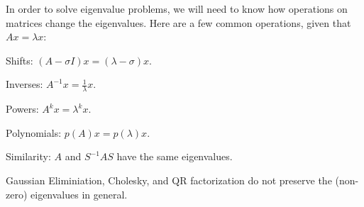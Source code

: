 In order to solve eigenvalue problems, we will need to know how operations on
matrices change the eigenvalues. Here are a few common operations, given that
$Ax=\lambda x$:
\begin{enumerati}
  \item Shifts: $(A-\sigma I)x=(\lambda-\sigma)x$.
  \item Inverses: $A^{-1}x=\frac1\lambda x$.
  \item Powers: $A^kx=\lambda^kx$.
  \item Polynomials: $p(A)x=p(\lambda)x$.
  \item Similarity: $A$ and $S^{-1}AS$ have the same eigenvalues.
  \item Gaussian Eliminiation, Cholesky, and QR factorization do not preserve
        the (non-zero) eigenvalues in general.
\end{enumerati}
